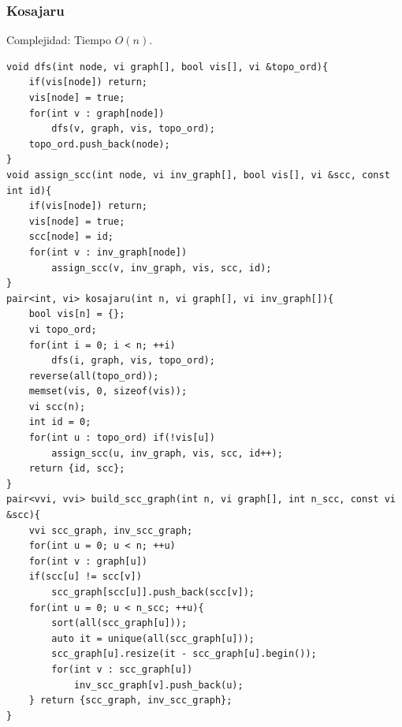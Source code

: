 \documentclass[12 pts,spanish,mexico]{article}
\numberwithin{equation}{section}
\begin{document}
\begin{multicols}{2}
\subsubsection{Kosajaru}
Complejidad: Tiempo $O(n)$.
\begin{verbatim}
void dfs(int node, vi graph[], bool vis[], vi &topo_ord){
    if(vis[node]) return;
    vis[node] = true;
    for(int v : graph[node])
        dfs(v, graph, vis, topo_ord);
    topo_ord.push_back(node);
}
void assign_scc(int node, vi inv_graph[], bool vis[], vi &scc, const int id){
    if(vis[node]) return;
    vis[node] = true;
    scc[node] = id;
    for(int v : inv_graph[node])
        assign_scc(v, inv_graph, vis, scc, id);
}
pair<int, vi> kosajaru(int n, vi graph[], vi inv_graph[]){
    bool vis[n] = {};
    vi topo_ord;
    for(int i = 0; i < n; ++i)
        dfs(i, graph, vis, topo_ord);
    reverse(all(topo_ord));
    memset(vis, 0, sizeof(vis));
    vi scc(n);
    int id = 0;
    for(int u : topo_ord) if(!vis[u])
        assign_scc(u, inv_graph, vis, scc, id++);
    return {id, scc};
}
pair<vvi, vvi> build_scc_graph(int n, vi graph[], int n_scc, const vi &scc){
    vvi scc_graph, inv_scc_graph;
    for(int u = 0; u < n; ++u)
    for(int v : graph[u])
    if(scc[u] != scc[v])
        scc_graph[scc[u]].push_back(scc[v]);
    for(int u = 0; u < n_scc; ++u){
        sort(all(scc_graph[u]));
        auto it = unique(all(scc_graph[u]));
        scc_graph[u].resize(it - scc_graph[u].begin());
        for(int v : scc_graph[u])
            inv_scc_graph[v].push_back(u);
    } return {scc_graph, inv_scc_graph};
}
\end{verbatim}


\end{multicols}
\end{document}
